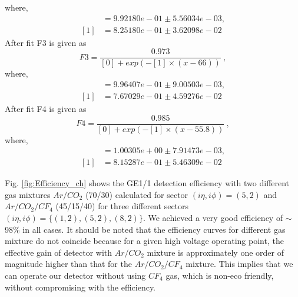 where,
\begin{align*}
[0] &= 9.92180e-01 \pm 5.56034e-03,\\
[1] &= 8.25180e-01 \pm 3.62098e-02
\end{align*} 
After fit F3 is given as
\begin{equation}
    F3 = \frac{0.973}{[0]+exp(-[1]\times(x-66))}~,
\end{equation}
where,
\begin{align*}
[0] &= 9.96407e-01 \pm 9.00503e-03, \\
[1] &= 7.67029e-01 \pm 4.59276e-02
\end{align*}
After fit F4 is given as
\begin{equation}
    F4 = \frac{0.985}{[0]+exp(-[1]\times(x-55.8))}~,
\end{equation}
where,
\begin{align*}
[0] &= 1.00305e+00 \pm 7.91473e-03,\\
[1] &= 8.15287e-01 \pm 5.46309e-02
\end{align*}

Fig. \ref{fig:Efficiency_ch} shows the GE1/1 detection efficiency with two different gas mixtures $Ar/CO_2$ (70/30) calculated for sector $(i\eta,i\phi)=(5,2)$ and $Ar/CO_2/CF_4$ (45/15/40) for three different sectors $(i\eta,i\phi)=\{(1,2),(5,2),(8,2)\}$.
We achieved a very good efficiency of $\sim$ 98\% in all cases.
It should be noted that the efficiency curves for different gas mixture do not coincide because for a given high voltage operating point, the effective gain of detector with $Ar/CO_2$  mixture is approximately one order of magnitude higher than that for the $Ar/CO_2/CF_4$ mixture.
This implies that we can operate our detector without using $CF_4$ gas, which is non-eco friendly, without compromising with the efficiency.
      

